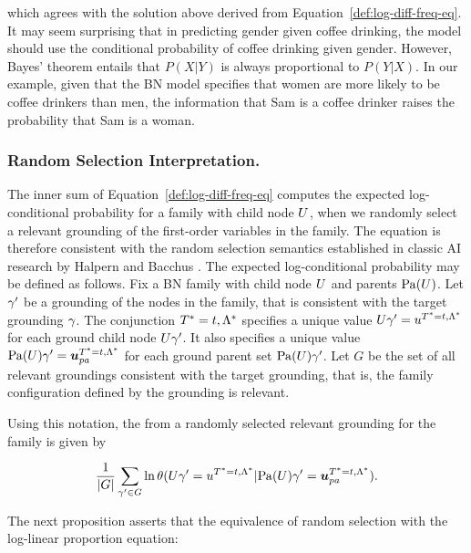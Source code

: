 \documentclass[runningheads,a4paper]{llncs}
\renewcommand{\Qconj}{\Appendterm{\FG{\TT} = \TV} {\QC}} %
\begin{document}
\noindent which agrees with the solution above derived from Equation~\eqref{def:log-diff-freq-eq}. It may seem surprising that in predicting gender given coffee drinking, the model should use the conditional probability of coffee drinking given gender. However, Bayes' theorem entails that $P(X|Y)$ is always proportional to $P(Y|X)$. In our example, given that the BN model specifies that women are more likely to be coffee drinkers than men, the information that Sam is a coffee drinker raises the probability that Sam is a woman. 

\subsubsection{Random Selection Interpretation.}

The inner sum of Equation~\eqref{def:log-diff-freq-eq} computes the expected log-conditional probability for a family with child node $U$, when we randomly select a relevant grounding of the first-order variables in the family. The equation is therefore consistent with the random selection semantics established in classic AI research by Halpern and Bacchus \cite{Halpern90,Bacchus90,Schulte2014}. 
The expected log-conditional probability may be defined as follows. Fix a BN family with child node $U$ and parents $\mathrm{Pa}(U)$. 
Let $\gamma'$ be a grounding of the nodes in the family, that is consistent with the target grounding $\gamma$. 
The conjunction $\Qconj$ specifies a unique value $\UT \grounding' = \UV^{\Qconj} $ for each ground child node $U \gamma'$. It also specifies a unique value $\Pa{\UT} \grounding'= \Prange{\UT}^{\Qconj}$ for each ground parent set $\mathrm{Pa}(U) \gamma'$. Let $G$ be the set of all relevant groundings consistent with the target grounding, that is, the family configuration defined by the grounding is relevant. 

Using this notation, the  from a randomly selected relevant grounding for the family is given by

\begin{equation}\label{eq:random-select}
\frac{1}{|G|} \sum_{\grounding' \in G} \ln \cprob{\UT \grounding' = \UV^{\Qconj}}{\Pa{\UT} \grounding' = \Prange{\UT}^{\Qconj}}.
\end{equation}

The next proposition asserts that the equivalence of random selection with the log-linear proportion equation:
\end{document}

